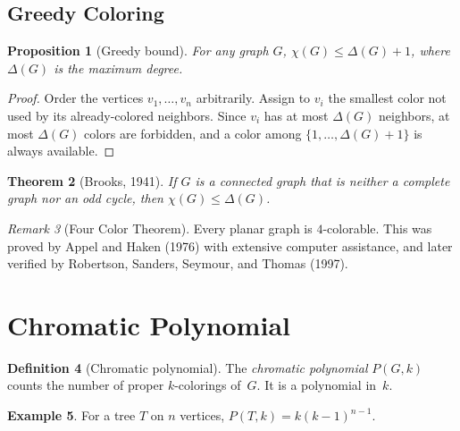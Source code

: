 \documentclass[12pt,a4paper,openany]{book}
\theoremstyle{definition}
\newtheorem{definition}{Definition}[chapter]
\newtheorem{example}[definition]{Example}
\theoremstyle{plain}
\newtheorem{theorem}[definition]{Theorem}
\newtheorem{proposition}[definition]{Proposition}
\theoremstyle{remark}
\newtheorem{remark}[definition]{Remark}
\begin{document}
\subsection{Greedy Coloring}
\label{ssec:greedy-coloring}

\begin{proposition}[Greedy bound]
\label{prop:greedy-bound}
For any graph $G$, $\chi(G)\le\Delta(G)+1$, where $\Delta(G)$ is the
maximum degree.
\end{proposition}

\begin{proof}
Order the vertices $v_1,\dots,v_n$ arbitrarily.  Assign to $v_i$ the
smallest color not used by its already-colored neighbors.  Since $v_i$
has at most $\Delta(G)$ neighbors, at most $\Delta(G)$ colors are
forbidden, and a color among $\{1,\dots,\Delta(G)+1\}$ is always
available.
\end{proof}

\begin{theorem}[Brooks, 1941]
\label{thm:brooks}
If $G$ is a connected graph that is neither a complete graph nor an odd
cycle, then $\chi(G)\le\Delta(G)$.
\end{theorem}

\begin{remark}[Four Color Theorem]
\label{rem:four-color}
Every planar graph is $4$-colorable.  This was proved by Appel and Haken
(1976) with extensive computer assistance, and later verified by
Robertson, Sanders, Seymour, and Thomas (1997).
\end{remark}

\section{Chromatic Polynomial}
\label{sec:chromatic-poly}

\begin{definition}[Chromatic polynomial]
\label{def:chromatic-poly}
The \emph{chromatic polynomial} $P(G,k)$ counts the number of proper
$k$-colorings of~$G$.  It is a polynomial in~$k$.
\end{definition}

\begin{example}
\label{ex:chromatic-tree}
For a tree $T$ on $n$ vertices, $P(T,k)=k(k-1)^{n-1}$.
\end{example}
\end{document}

